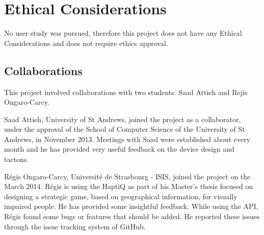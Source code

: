 \chapter{Ethical Considerations}

No user study was pursued, therefore this project does not have any Ethical Considerations and does not require ethics approval.\newline \par

\section{Collaborations}
This project involved collaborations with two students: Saad Attieh and Rejis Ongaro-Carcy.  

Saad Attieh, University of St Andrews, joined the project as a collaborator, under the approval of the School of Computer Science of the University of St Andrews, in November 2013. Meetings with Saad were established about every month and he has provided very useful feedback on the device design and tactons. 

Régis Ongaro-Carcy, Université de Strasbourg - ISIS, joined the project on the  March 2014. Régis is using the HaptiQ as part of his Master's thesis focused on designing a strategic game, based on geographical information, for visually impaired people. He has provided some insightful feedback. While using the API, Régis found some bugs or features that should be added. He reported these issues through the issue tracking system of GitHub.